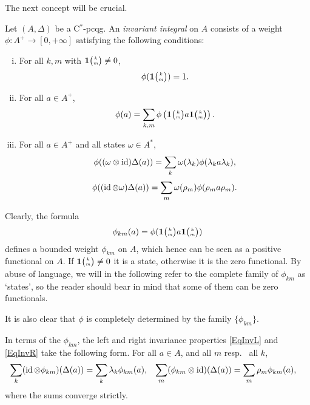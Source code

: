 The next concept will be crucial.
\begin{Def} Let $(A,\Delta)$ be a C$^*$-pcqg. An \emph{invariant integral} on $A$ consists of a weight $\phi: A^+ \rightarrow [0,+\infty]$ satisfying the following conditions:
\begin{enumerate}[i)]
\item For all $k,m$ with $\mathbf{1}{\tiny {\begin{pmatrix} k\\m\end{pmatrix}}}\neq 0$, \[\phi(\mathbf{1}{\tiny {\begin{pmatrix} k\\m\end{pmatrix}}}) = 1.\]
\item For all $a\in A^+$, \[\phi(a) = \sum_{k,m} \phi\left(\mathbf{1}{\tiny {\begin{pmatrix} k\\m\end{pmatrix}}}a\mathbf{1}{\tiny {\begin{pmatrix} k\\m\end{pmatrix}}}\right).\]
\item For all $a\in A^+$ and all states $\omega\in A^*$, \begin{equation}\label{EqInvL} \phi((\omega \otimes \operatorname{id})\Delta(a)) = \sum_{k} \omega(\lambda_k)\phi(\lambda_ka\lambda_k),\end{equation} \begin{equation}\label{EqInvR} \phi((\operatorname{id}\otimes \omega)\Delta(a)) = \sum_{m}\omega(\rho_m)\phi(\rho_ma\rho_m).\end{equation}
\end{enumerate} 
\end{Def}





Clearly, the formula \[\phi_{km}(a) = \phi(\mathbf{1}{\tiny {\begin{pmatrix} k\\m\end{pmatrix}}}a\mathbf{1}{\tiny {\begin{pmatrix} k\\m\end{pmatrix}}})\] defines a bounded weight $\phi_{km}$ on $A$, which hence can be seen as a positive functional on $A$. If $\mathbf{1}{\tiny {\begin{pmatrix} k\\m\end{pmatrix}}}\neq 0$ it is a state, otherwise it is the zero functional. By abuse of language, we will in the following refer to the complete family of $\phi_{km}$ as `states', so the reader should bear in mind that some of them can be zero functionals.

It is also clear that $\phi$ is completely determined by the family
$\{\phi_{km}\}$.  

In terms of the $\phi_{km}$, the left and right invariance properties
\eqref{EqInvL} and \eqref{EqInvR} take the following form.  For all
$a\in A$, and all $m$ resp.~ all $k$,
\begin{align} \label{eq:invariance}
\sum_{k}  (\operatorname{id} \otimes
\phi_{km})(\Delta(a)) &= \sum_{k}  \lambda_{k} \phi_{km}(a), &
\sum_{m} (\phi_{km} \otimes \operatorname{id})(\Delta(a))&= \sum_{m} \rho_{m} \phi_{km}(a)  ,
\end{align}
where the sums converge strictly.

